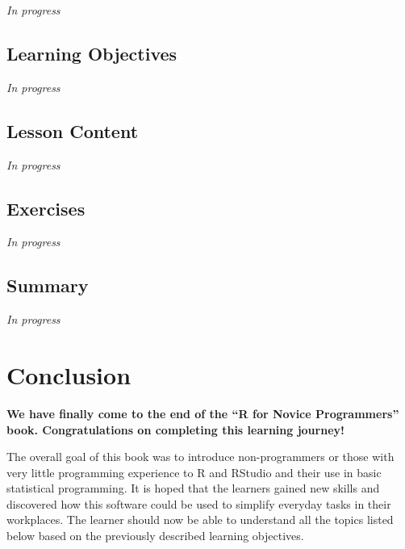 \documentclass[
  letterpaper,
  DIV=11,
  numbers=noendperiod]{scrreprt}
\begin{document}
\emph{In progress}

\hypertarget{learning-objectives-11}{%
\section{Learning Objectives}\label{learning-objectives-11}}

\emph{In progress}

\hypertarget{lesson-content-11}{%
\section{Lesson Content}\label{lesson-content-11}}

\emph{In progress}

\hypertarget{exercises-11}{%
\section{Exercises}\label{exercises-11}}

\emph{In progress}

\hypertarget{summary-12}{%
\section{Summary}\label{summary-12}}

\emph{In progress}


\hypertarget{conclusion}{%
\chapter*{Conclusion}\label{conclusion}}


\textbf{We have finally come to the end of the ``R for Novice
Programmers'' book. Congratulations on completing this learning
journey!}

The overall goal of this book was to introduce non-programmers or those
with very little programming experience to R and RStudio and their use
in basic statistical programming. It is hoped that the learners gained
new skills and discovered how this software could be used to simplify
everyday tasks in their workplaces. The learner should now be able to
understand all the topics listed below based on the previously described
learning objectives.
\end{document}
